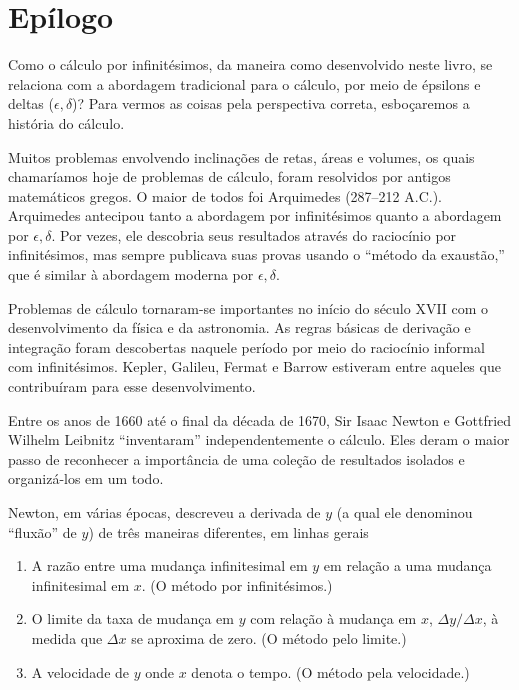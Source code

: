 \graphicspath{ {./figuras/98_epilogue/} }
\chapter*{Epílogo}

\setcounter{chapter}{5}%
\renewcommand{\thechapter}{\Alph{chapter}}%
\renewcommand{\thefigure}{\thechapter.\arabic{figure}}


Como o cálculo por infinitésimos, da maneira como desenvolvido neste livro,
se relaciona com a abordagem tradicional para o cálculo, por meio de
épsilons e deltas ($\epsilon,\delta$)?
Para vermos as coisas pela perspectiva correta,
esboçaremos a história do cálculo.

Muitos problemas envolvendo inclinações de retas, áreas e volumes, os quais
chamaríamos hoje de problemas de cálculo, foram resolvidos por antigos
matemáticos gregos. O maior de todos foi Arquimedes (287--212 A.C.).
Arquimedes antecipou tanto a abordagem por infinitésimos quanto a
abordagem por $\epsilon,\delta$. Por vezes, ele descobria seus resultados
através do raciocínio por infinitésimos, mas sempre publicava suas provas
usando o ``método da exaustão,'' que é similar à abordagem moderna por
$\epsilon,\delta$.

Problemas de cálculo tornaram-se importantes no início do século
XVII com o desenvolvimento da física e da astronomia. As regras
básicas de derivação e integração foram descobertas naquele período
por meio do raciocínio informal com infinitésimos. Kepler, Galileu,
Fermat e Barrow estiveram entre aqueles que contribuíram para esse
desenvolvimento.

Entre os anos de 1660 até o final da década de 1670, Sir Isaac Newton e
Gottfried Wilhelm Leibnitz ``inventaram'' independentemente o cálculo.
Eles deram o maior passo de reconhecer a importância de uma coleção
de resultados isolados e organizá-los em um todo.

Newton, em várias épocas, descreveu a derivada de $y$ (a qual ele
denominou ``fluxão'' de $y$) de
três maneiras diferentes, em linhas gerais
\begin{enumerate}[(1)]
\item A razão entre uma mudança infinitesimal em $y$ em relação a
      uma mudança infinitesimal em $x$. (O método por infinitésimos.)
\item O limite da taxa de mudança em $y$ com relação à mudança em $x$,
      $\Delta y / \Delta x$, à medida que $\Delta x$ se aproxima de
      zero. (O método pelo limite.)
\item A velocidade de $y$ onde $x$ denota o tempo. (O método pela
      velocidade.)
\end{enumerate}

